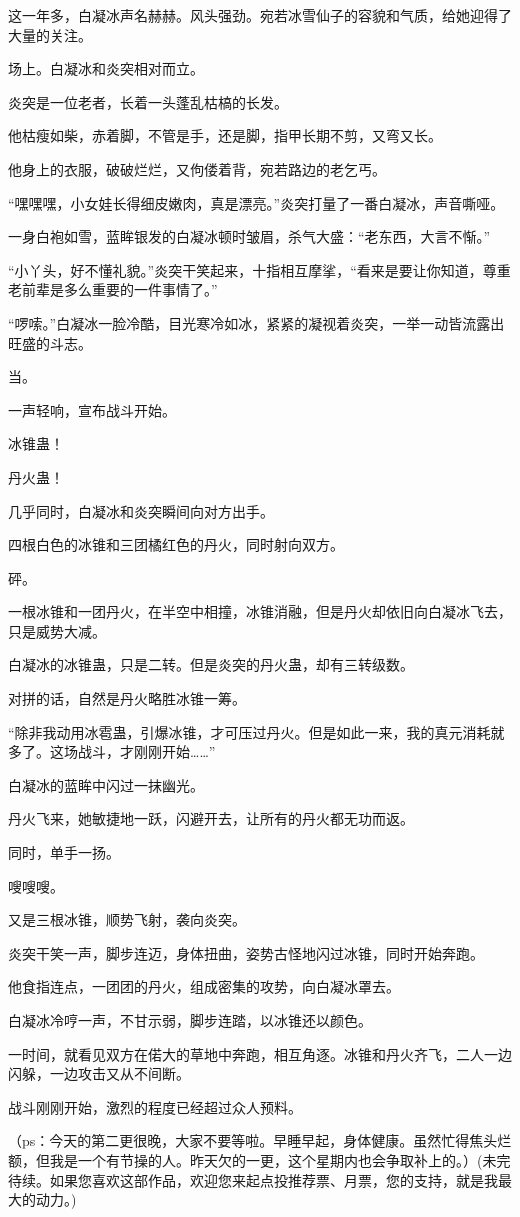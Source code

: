 \begin{this_body}
这一年多，白凝冰声名赫赫。风头强劲。宛若冰雪仙子的容貌和气质，给她迎得了大量的关注。

场上。白凝冰和炎突相对而立。

炎突是一位老者，长着一头蓬乱枯槁的长发。

他枯瘦如柴，赤着脚，不管是手，还是脚，指甲长期不剪，又弯又长。

他身上的衣服，破破烂烂，又佝偻着背，宛若路边的老乞丐。

“嘿嘿嘿，小女娃长得细皮嫩肉，真是漂亮。”炎突打量了一番白凝冰，声音嘶哑。

一身白袍如雪，蓝眸银发的白凝冰顿时皱眉，杀气大盛：“老东西，大言不惭。”

“小丫头，好不懂礼貌。”炎突干笑起来，十指相互摩挲，“看来是要让你知道，尊重老前辈是多么重要的一件事情了。”

“啰嗦。”白凝冰一脸冷酷，目光寒冷如冰，紧紧的凝视着炎突，一举一动皆流露出旺盛的斗志。

当。

一声轻响，宣布战斗开始。

冰锥蛊！

丹火蛊！

几乎同时，白凝冰和炎突瞬间向对方出手。

四根白色的冰锥和三团橘红色的丹火，同时射向双方。

砰。

一根冰锥和一团丹火，在半空中相撞，冰锥消融，但是丹火却依旧向白凝冰飞去，只是威势大减。

白凝冰的冰锥蛊，只是二转。但是炎突的丹火蛊，却有三转级数。

对拼的话，自然是丹火略胜冰锥一筹。

“除非我动用冰雹蛊，引爆冰锥，才可压过丹火。但是如此一来，我的真元消耗就多了。这场战斗，才刚刚开始……”

白凝冰的蓝眸中闪过一抹幽光。

丹火飞来，她敏捷地一跃，闪避开去，让所有的丹火都无功而返。

同时，单手一扬。

嗖嗖嗖。

又是三根冰锥，顺势飞射，袭向炎突。

炎突干笑一声，脚步连迈，身体扭曲，姿势古怪地闪过冰锥，同时开始奔跑。

他食指连点，一团团的丹火，组成密集的攻势，向白凝冰罩去。

白凝冰冷哼一声，不甘示弱，脚步连踏，以冰锥还以颜色。

一时间，就看见双方在偌大的草地中奔跑，相互角逐。冰锥和丹火齐飞，二人一边闪躲，一边攻击又从不间断。

战斗刚刚开始，激烈的程度已经超过众人预料。

（ps：今天的第二更很晚，大家不要等啦。早睡早起，身体健康。虽然忙得焦头烂额，但我是一个有节操的人。昨天欠的一更，这个星期内也会争取补上的。）(未完待续。如果您喜欢这部作品，欢迎您来起点投推荐票、月票，您的支持，就是我最大的动力。)

\end{this_body}

